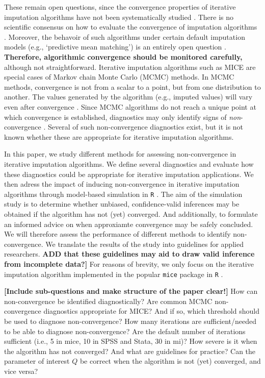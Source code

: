 \documentclass[Royal,times,sageh]{sagej}
\begin{document}
These remain open questions, since the convergence properties of iterative imputation algorithms have not been systematically studied \citep{buur18}. There is no scientific consensus on how to evaluate the convergence of imputation algorithms \citep{taka17}. Moreover, the behavoir of such algorithms under certain default imputation models (e.g., `predictive mean matching') is an entirely open question \citep{murr18}. \textbf{Therefore, algorithmic convergence should be monitored carefully, }although not straightforward. Iterative imputation algorithms such as MICE are special cases of Markov chain Monte Carlo (MCMC) methods. In MCMC methods, convergence is not from a scalar to a point, but from one distribution to another. The values generated by the algorithm (e.g., imputed values) will vary even after convergence \citep{gelm13}. Since MCMC algorithms do not reach a unique point at which convergence is established, diagnostics may only identify signs of \emph{non}-convergence \citep{hoff09}. Several of such non-convergence diagnostics exist, but it is not known whether these are appropriate for iterative imputation algorithms.

In this paper, we study different methods for assessing non-convergence in iterative imputation algorithms. We define several diagnostics and evaluate how these diagnostics could be appropriate for iterative imputation applications. We then adress the impact of inducing non-convergence in iterative imputation algorithms through model-based simulation in \texttt{R} \citep{R}. The aim of the simulation study is to determine whether unbiased, confidence-valid inferences may be obtained if the algorithm has not (yet) converged. And additionally, to formulate an informed advice on when approxiamte convergence may be safely concluded. We will therefore assess the performance of different methods to identify non-convergence. We translate the results of the study into guidelines for applied researchers. \textbf{ADD that these guidelines may aid to draw valid inference from incomplete data?{]}} For reasons of brevity, we only focus on the iterative imputation algorithm implemented in the popular \texttt{mice} package \citep{mice} in \texttt{R} \citep{R}.

\textbf{{[}Include sub-questions and make structure of the paper clear!{]}} How can non-convergence be identified diagnostically? Are common MCMC non-convergence diagnostics appropriate for MICE? And if so, which threshold should be used to diagnose non-convergence? How many iterations are sufficient/needed to be able to diagnose non-convergence? Are the default number of iterations sufficient (i.e., 5 in mice, 10 in SPSS and Stata, 30 in mi)? How severe is it when the algorithm has not converged? And what are guidelines for practice? Can the parameter of interest \(Q\) be correct when the algorithm is not (yet) converged, and vice versa?
\end{document}
